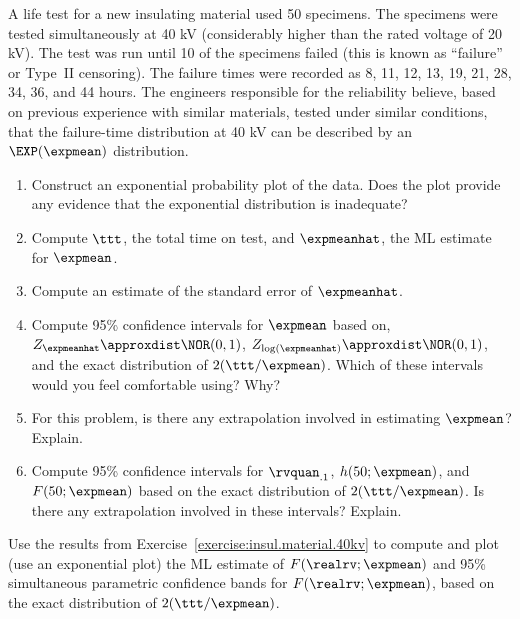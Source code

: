 \begin{exercise}
\label{exercise:insul.material.40kv}
 A life test for a new insulating material used 50 specimens.  The
specimens were tested simultaneously at 40 kV (considerably higher
than the rated voltage of 20 kV). The test was run until 10 of the
specimens failed (this is known as ``failure'' 
or Type~II censoring). The failure
times were recorded as 8, 11, 12, 13, 19, 21, 28,
34, 36, and 44 hours. The engineers responsible for the reliability
believe, based on previous experience with similar materials, tested
under similar conditions, that the failure-time distribution at 40
kV can be described by an $\EXP(\expmean)$ distribution.
\begin{enumerate}
\item	
Construct an exponential probability plot of the data.
Does the plot provide any evidence that the exponential distribution
is inadequate?
\item	
Compute $\ttt$, the total time on test, 
and $\expmeanhat$, the ML estimate for $\expmean$.
\item	
Compute an estimate of the standard error of $\expmeanhat$.
\item	
Compute 95\% confidence intervals for $\expmean$ based on,
$Z_{\expmeanhat} \approxdist \NOR(0,1)$,
$Z_{\log(\expmeanhat)} \approxdist \NOR(0,1)$, and
the exact distribution of $2(\ttt/\expmean)$.
Which of these intervals would you feel comfortable using? Why?
\item	
For this problem, is there any extrapolation involved in 
estimating $\expmean$? Explain.
\item	
Compute 95\% confidence intervals for $\rvquan_{.1}$,
$h(50;\expmean)$, and $F(50;\expmean)$
based on the exact distribution of $2(\ttt/\expmean)$. Is there any 
extrapolation involved in these intervals? Explain.
\end{enumerate}
\end{exercise}

\begin{exercise}
Use the results from Exercise~\ref{exercise:insul.material.40kv} to
compute and plot (use an exponential plot) the ML estimate of
$F(\realrv;\expmean)$ and 95\% simultaneous parametric
confidence bands for $F(\realrv;\expmean)$, based on the exact
distribution of $2(\ttt/\expmean)$.
\end{exercise}

